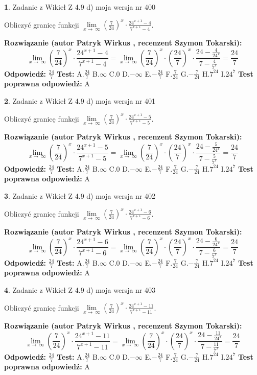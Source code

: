 \documentclass[12pt, a4paper]{article}
\theoremstyle{definition} %
\newtheorem{zad}{}
\newcommand{\zadStart}[1]{\begin{zad}#1\newline}
\newcommand{\zadStop}{\end{zad}}
\newcommand{\rozwStart}[2]{\noindent \textbf{Rozwiązanie (autor #1 , recenzent #2): }\newline}
\newcommand{\rozwStop}{\newline}
\newcommand{\odpStart}{\noindent \textbf{Odpowiedź:}\newline}
\newcommand{\odpStop}{\newline}
\newcommand{\testStart}{\noindent \textbf{Test:}\newline}
\newcommand{\testStop}{\newline}
\newcommand{\kluczStart}{\noindent \textbf{Test poprawna odpowiedź:}\newline}
\newcommand{\kluczStop}{\newline}
\begin{document}
\zadStart{Zadanie z Wikieł Z 4.9 d) moja wersja nr 400}


Obliczyć granicę funkcji  $\lim\limits_{x\to\ \infty}(\frac{7}{24})^{x}\cdot\frac{24^{x+1}-4}{7^{x+1}-4}$.
\zadStop
\rozwStart{Patryk Wirkus}{Szymon Tokarski}
$$\lim\limits_{x\to\ \infty}(\frac{7}{24})^{x}\cdot\frac{24^{x+1}-4}{7^{x+1}-4}=\lim\limits_{x\to\ \infty}(\frac{7}{24})^{x}\cdot(\frac{24}{7})^{x} \cdot \frac{24-\frac{4}{24^{x}}}{7-\frac{4}{7^{x}}} = \frac{24}{7}$$
\rozwStop
\odpStart
$\frac{24}{7}$
\odpStop
\testStart
A.$\frac{24}{7}$ B.$\infty$ C.$0$ D.$-\infty$ E.$-\frac{24}{7}$
F.$\frac{7}{24}$ G.$-\frac{7}{24}$
H.$7^{24}$
I.$24^{7}$
\testStop
\kluczStart
A
\kluczStop



\zadStart{Zadanie z Wikieł Z 4.9 d) moja wersja nr 401}


Obliczyć granicę funkcji  $\lim\limits_{x\to\ \infty}(\frac{7}{24})^{x}\cdot\frac{24^{x+1}-5}{7^{x+1}-5}$.
\zadStop
\rozwStart{Patryk Wirkus}{Szymon Tokarski}
$$\lim\limits_{x\to\ \infty}(\frac{7}{24})^{x}\cdot\frac{24^{x+1}-5}{7^{x+1}-5}=\lim\limits_{x\to\ \infty}(\frac{7}{24})^{x}\cdot(\frac{24}{7})^{x} \cdot \frac{24-\frac{5}{24^{x}}}{7-\frac{5}{7^{x}}} = \frac{24}{7}$$
\rozwStop
\odpStart
$\frac{24}{7}$
\odpStop
\testStart
A.$\frac{24}{7}$ B.$\infty$ C.$0$ D.$-\infty$ E.$-\frac{24}{7}$
F.$\frac{7}{24}$ G.$-\frac{7}{24}$
H.$7^{24}$
I.$24^{7}$
\testStop
\kluczStart
A
\kluczStop



\zadStart{Zadanie z Wikieł Z 4.9 d) moja wersja nr 402}


Obliczyć granicę funkcji  $\lim\limits_{x\to\ \infty}(\frac{7}{24})^{x}\cdot\frac{24^{x+1}-6}{7^{x+1}-6}$.
\zadStop
\rozwStart{Patryk Wirkus}{Szymon Tokarski}
$$\lim\limits_{x\to\ \infty}(\frac{7}{24})^{x}\cdot\frac{24^{x+1}-6}{7^{x+1}-6}=\lim\limits_{x\to\ \infty}(\frac{7}{24})^{x}\cdot(\frac{24}{7})^{x} \cdot \frac{24-\frac{6}{24^{x}}}{7-\frac{6}{7^{x}}} = \frac{24}{7}$$
\rozwStop
\odpStart
$\frac{24}{7}$
\odpStop
\testStart
A.$\frac{24}{7}$ B.$\infty$ C.$0$ D.$-\infty$ E.$-\frac{24}{7}$
F.$\frac{7}{24}$ G.$-\frac{7}{24}$
H.$7^{24}$
I.$24^{7}$
\testStop
\kluczStart
A
\kluczStop



\zadStart{Zadanie z Wikieł Z 4.9 d) moja wersja nr 403}


Obliczyć granicę funkcji  $\lim\limits_{x\to\ \infty}(\frac{7}{24})^{x}\cdot\frac{24^{x+1}-11}{7^{x+1}-11}$.
\zadStop
\rozwStart{Patryk Wirkus}{Szymon Tokarski}
$$\lim\limits_{x\to\ \infty}(\frac{7}{24})^{x}\cdot\frac{24^{x+1}-11}{7^{x+1}-11}=\lim\limits_{x\to\ \infty}(\frac{7}{24})^{x}\cdot(\frac{24}{7})^{x} \cdot \frac{24-\frac{11}{24^{x}}}{7-\frac{11}{7^{x}}} = \frac{24}{7}$$
\rozwStop
\odpStart
$\frac{24}{7}$
\odpStop
\testStart
A.$\frac{24}{7}$ B.$\infty$ C.$0$ D.$-\infty$ E.$-\frac{24}{7}$
F.$\frac{7}{24}$ G.$-\frac{7}{24}$
H.$7^{24}$
I.$24^{7}$
\testStop
\kluczStart
A
\kluczStop
\end{document}

